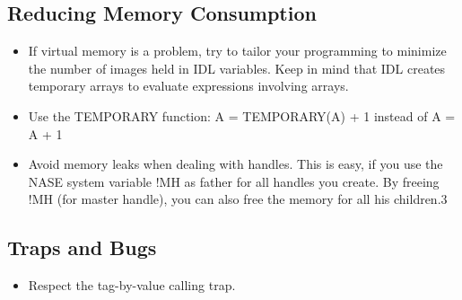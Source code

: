 \documentclass[12pt]{article}
\begin{document}
\subsection{Reducing Memory Consumption}
\begin{itemize}
\item If virtual memory is a problem, try to tailor your programming to minimize the number of images held in IDL variables. Keep in mind that IDL creates temporary arrays to evaluate expressions involving arrays.  
\item Use the TEMPORARY function: A = TEMPORARY(A) + 1 instead of A = A + 1
\item Avoid memory leaks when dealing with handles. This is easy, if you use the NASE system variable !MH as father for all handles you create. By freeing !MH (for master handle), you can also free the memory for all his children.3
\end{itemize}


\subsection{Traps and Bugs}
\begin{itemize}
\item Respect the tag-by-value calling trap.
\end{itemize}

%
% 
\end{document}
